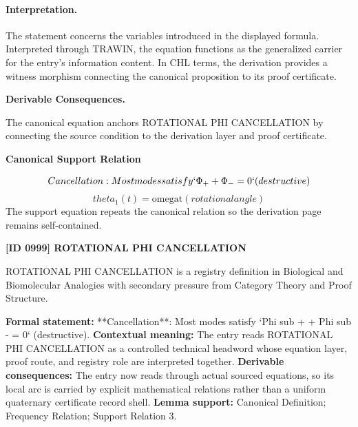 \paragraph{Interpretation.}
The statement concerns the variables introduced in the displayed formula. Interpreted through TRAWIN, the equation functions as the generalized carrier for the entry’s information content. In CHL terms, the derivation provides a witness morphism connecting the canonical proposition to its proof certificate.

\par\vspace{0.35em}
\noindent\textbf{Derivable Consequences.}\quad
\begingroup
\footnotesize
\raggedright
The canonical equation anchors ROTATIONAL PHI CANCELLATION by connecting the source condition to the derivation layer and proof certificate.
\par\endgroup

\noindent\textbf{Canonical Support Relation}\par
\[
Cancellation: Most modes satisfy `\Phi_+ + \Phi_- = 0` (destructive)
\]
\[
theta_1(t) = \mathrm{omegat} (rotational angle)
\]
\noindent The support equation repeats the canonical relation so the derivation page remains self-contained.\par

\clearpage
\noindent\textbf{[ID 0999] ROTATIONAL PHI CANCELLATION}\par
\vspace{0.35em}
\begingroup\small
{}
ROTATIONAL PHI CANCELLATION is a registry definition in Biological and Biomolecular Analogies with secondary pressure from Category Theory and Proof Structure.

\begingroup\footnotesize\setlength{\emergencystretch}{3em}\sloppy
\textbf{Formal statement:} **Cancellation**: Most modes satisfy `Phi sub + + Phi sub - = 0` (destructive). \textbf{Contextual meaning:} The entry reads ROTATIONAL PHI CANCELLATION as a controlled technical headword whose equation layer, proof route, and registry role are interpreted together. \textbf{Derivable consequences:} The entry now reads through actual sourced equations, so its local arc is carried by explicit mathematical relations rather than a uniform quaternary certificate record shell. \textbf{Lemma support:} Canonical Definition; Frequency Relation; Support Relation 3.\par
\endgroup

